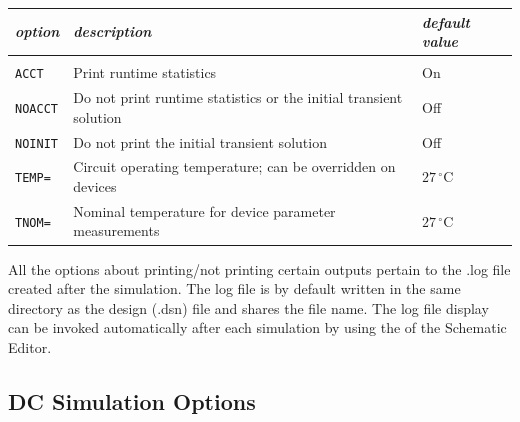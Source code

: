 \begin{tabular}{lp{8cm}p{2cm}}
\textit{option} & \textit{description} & \textit{default value}\\ \hline \\ \vspace{-0.8\parskip}
\texttt{ACCT} & Print runtime statistics & On \\
\texttt{NOACCT} & Do not print runtime statistics or the initial transient solution & Off \\
\texttt{NOINIT} & Do not print the initial transient solution & Off \\
\texttt{TEMP=} & Circuit operating temperature; can be overridden on devices & $27\,^{\circ}\mathrm{C}$ \\
\texttt{TNOM=} & Nominal temperature for device parameter measurements & $27\,^{\circ}\mathrm{C}$
\end{tabular}

All the options about printing/not printing certain outputs pertain to the \textsf{.log} file created after the simulation.  The log file is by default written in the same directory as the design (\textsf{.dsn}) file and shares the file name.  The log file display can be invoked automatically after each simulation by using the  of the Schematic Editor.

\subsection{DC Simulation Options}
\label{subsec_satco_dcoptions}

